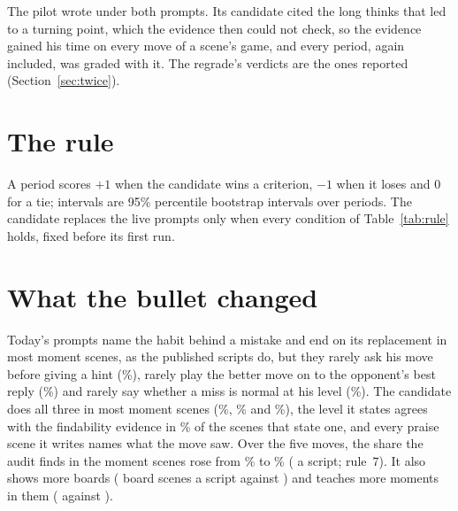 \documentclass[11pt]{article}
\begin{document}
The pilot wrote \FirstGradedPeriod{} under both prompts. Its candidate cited the long thinks that led
to a turning point, which the evidence then could not check, so the evidence gained his time on every
move of a scene's game, and every period, \FirstGradedPeriod{} again included, was graded with it.
The regrade's verdicts are the ones reported (Section~\ref{sec:twice}).

\section{The rule}

A period scores $+1$ when the candidate wins a criterion, $-1$ when it loses and $0$ for a tie;
intervals are 95\% percentile bootstrap intervals over periods. The candidate replaces the live
prompts only when every condition of Table~\ref{tab:rule} holds, fixed before its first run.

\begin{table}[h]
\centering
\small\RuleTable
\caption{The rule, fixed before the candidate's first run. Coaching and overall are the judge's
scores per period; the claim rows and the coaching moves are the audit's numbers per script, candidate
minus today's prompts; the length is the candidate's script heard once over today's on the same
period.}
\label{tab:rule}
\end{table}

\section{What the bullet changed}

\begin{table}[h]
\centering
\small\MovesTable
\caption{The coaching moves the audit finds, pooled over the \Cases{} periods: the share of the
scenes that owe a move and make it, with the number owing it in brackets. A moment scene owes the
habit, its replacement and the level; it owes the open question only when it asks him something, and
the reply only when it shows a better move. In the middle rows, consecutive board scenes on the same
position count once, and a move counts as made when any of them makes it.}
\label{tab:moves}
\end{table}

Today's prompts name the habit behind a mistake and end on its replacement in most moment scenes,
as the published scripts do, but they rarely ask his move before giving a hint
(\BaseOpenQuestion\%), rarely play the better move on to the opponent's best reply
(\BaseThenWhat\%) and rarely say whether a miss is normal at his level (\BaseLevel\%). The candidate
does all three in most moment scenes (\CandOpenQuestion\%, \CandThenWhat\% and \CandLevel\%), the
level it states agrees with the findability evidence in \CandLevelTrue\% of the scenes that state
one, and every praise scene it writes names what the move saw. Over the five moves, the share the
audit finds in the moment scenes rose from \ShareBase\% to \ShareCand\% (\ShareDiff{} a script;
rule~7). It also shows more boards (\CandBoardScenes{} board scenes a script against
\BaseBoardScenes) and teaches more moments in them (\CandMoments{} against \BaseMoments).
\end{document}

